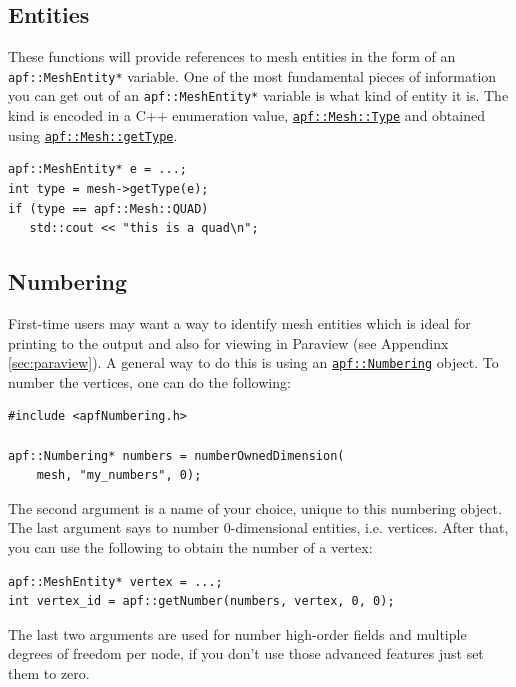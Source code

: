 \documentclass{article}
\begin{document}
\subsection{Entities}

These functions will provide references to mesh entities in the
form of an \texttt{apf::MeshEntity*} variable.
One of the most fundamental pieces of information you can get
out of an \texttt{apf::MeshEntity*} variable is what kind of
entity it is.
The kind is encoded in a C++ enumeration value,
\href{http://scorec.rpi.edu/~dibanez/core/classapf_1_1Mesh.html#a68729141a3c5781a24bb72ea6160b898}{\texttt{apf::Mesh::Type}}
and obtained using
\href{http://scorec.rpi.edu/~dibanez/core/classapf_1_1Mesh.html#a233fb2ada6d244ea1fffbbdd76e2f6b8}{\texttt{apf::Mesh::getType}}.

\begin{lstlisting}
apf::MeshEntity* e = ...;
int type = mesh->getType(e);
if (type == apf::Mesh::QUAD)
   std::cout << "this is a quad\n";
\end{lstlisting}

\subsection{Numbering}
\label{sec:num}

First-time users may want a way to identify mesh entities which
is ideal for printing to the output and also for viewing in
Paraview (see Appendinx \ref{sec:paraview}).
A general way to do this is using an
\href{http://scorec.rpi.edu/~dibanez/core/apfNumbering_8h.html}{\texttt{apf::Numbering}}
object.
To number the vertices, one can do the following:

\begin{lstlisting}
#include <apfNumbering.h>

apf::Numbering* numbers = numberOwnedDimension(
    mesh, "my_numbers", 0);
\end{lstlisting}

The second argument is a name of your choice, unique to this numbering object.
The last argument says to number 0-dimensional entities, i.e. vertices.
After that, you can use the following to obtain the number of a
vertex:

\begin{lstlisting}
apf::MeshEntity* vertex = ...;
int vertex_id = apf::getNumber(numbers, vertex, 0, 0);
\end{lstlisting}

The last two arguments are used for number high-order fields and
multiple degrees of freedom per node, if you don't use those
advanced features just set them to zero.
\end{document}
